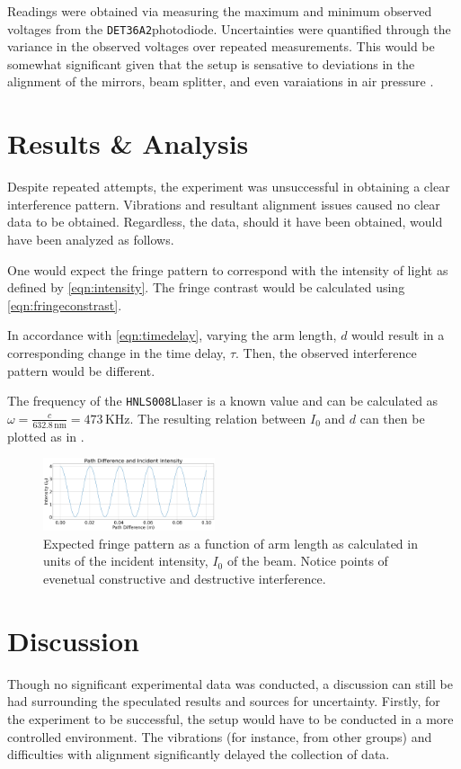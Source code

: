 \documentclass[aip, cp, amsmath, amssymb, reprint]{revtex4-2}
\newcommand{\pdiode}{\texttt{DET36A2}\space}
\newcommand{\hene}{\texttt{HNLS008L}\space}
\begin{document}
        Readings were obtained via measuring the maximum and minimum observed voltages from the \pdiode photodiode. Uncertainties were quantified through the variance in the observed voltages over repeated measurements. This would be somewhat significant given that the setup is sensative to deviations in the alignment of the mirrors, beam splitter, and even varaiations in air pressure \cite{labmanual}.

    \section{Results \& Analysis}
        Despite repeated attempts, the experiment was unsuccessful in obtaining a clear interference pattern. Vibrations and resultant alignment issues caused no clear data to be obtained. Regardless, the data, should it have been obtained, would have been analyzed as follows.

        One would expect the fringe pattern to correspond with the intensity of light as defined by \eqref{eqn:intensity}. The fringe contrast would be calculated using \eqref{eqn:fringeconstrast}. 

        In accordance with \eqref{eqn:timedelay}, varying the arm length, $d$ would result in a corresponding change in the time delay, $\tau$. Then, the observed interference pattern would be different.

        The frequency of the \hene laser is a known value \cite{henemanual} and can be calculated as $\omega = \frac{c}{632.8\,\text{nm}} = 473\,\text{KHz}$. The resulting relation between $I_0$ and $d$ can then be plotted as in .

        \begin{figure}[H]
            \centering
            \includegraphics[width=0.45\textwidth]{figures/PathDiffI0.png}
            \caption{Expected fringe pattern as a function of arm length as calculated in units of the incident intensity, $I_0$ of the beam. Notice points of evenetual constructive and destructive interference.}
            \label{fig:fringe}
        \end{figure}


    \section{Discussion}
        Though no significant experimental data was conducted, a discussion can still be had surrounding the speculated results and sources for uncertainty. Firstly, for the experiment to be successful, the setup would have to be conducted in a more controlled environment. The vibrations (for instance, from other groups) and difficulties with alignment significantly delayed the collection of data. 
\end{document}
